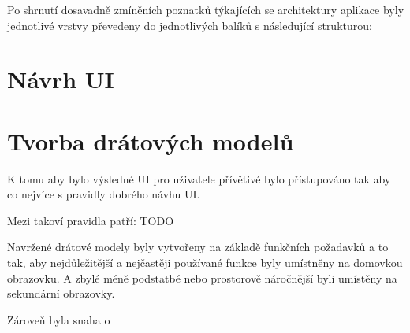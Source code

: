 \bigskip

Po shrnutí dosavadně zmíněních poznatků týkajících se architektury aplikace byly jednotlivé vrstvy převedeny do jednotlivých balíků s následující
strukturou:

\bigskip






\section{Návrh UI}

\section{Tvorba drátových modelů}
K tomu aby bylo výsledné UI pro uživatele přívětivé bylo přístupováno tak aby co nejvíce  s pravidly dobrého návhu UI.

Mezi takoví pravidla patří:
TODO

Navržené drátové modely byly vytvořeny na základě funkčních požadavků a to tak, aby nejdůležitější a nejčastěji používané funkce byly 
umístněny na domovkou obrazovku. A zbylé méně podstatbé nebo prostorově náročnější byli umístěny na sekundární obrazovky.

Zároveň byla snaha o 

\pagebreak


